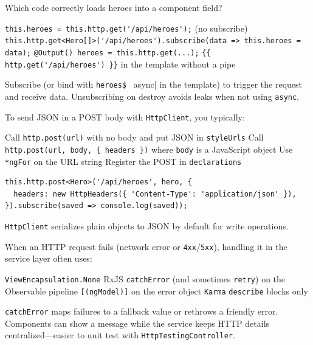 \question[4]
Which code correctly loads heroes into a component field?
\begin{choices}
  \choice \lstinline[style=tsinline]|this.heroes = this.http.get('/api/heroes');| (no subscribe)
  \CorrectChoice \lstinline[style=tsinline]|this.http.get<Hero[]>('/api/heroes').subscribe(data => this.heroes = data);|
  \choice \lstinline[style=tsinline]|@Output() heroes = this.http.get(...);|
  \choice \lstinline[style=htmlinline]|{{ http.get('/api/heroes') }}| in the template without a pipe
\end{choices}
\begin{solution}
  Subscribe (or bind with \lstinline[style=htmlinline]|heroes$ | async| in the template) to trigger the request and receive data. Unsubscribing on destroy avoids leaks when not using \lstinline[style=htmlinline]|async|.
\end{solution}

\question[4]
To send JSON in a POST body with \texttt{HttpClient}, you typically:
\begin{choices}
  \choice Call \lstinline[style=tsinline]|http.post(url)| with no body and put JSON in \texttt{styleUrls}
  \CorrectChoice Call \lstinline[style=tsinline]|http.post(url, body, { headers })| where \texttt{body} is a JavaScript object
  \choice Use \lstinline[style=htmlinline]|*ngFor| on the URL string
  \choice Register the POST in \texttt{declarations}
\end{choices}
\begin{solution}
\begin{lstlisting}[style=ts]
this.http.post<Hero>('/api/heroes', hero, {
  headers: new HttpHeaders({ 'Content-Type': 'application/json' }),
}).subscribe(saved => console.log(saved));
\end{lstlisting}
  \texttt{HttpClient} serializes plain objects to JSON by default for write operations.
\end{solution}

\question[4]
When an HTTP request fails (network error or \texttt{4xx}/\texttt{5xx}), handling it in the service layer often uses:
\begin{choices}
  \choice \lstinline[style=tsinline]|ViewEncapsulation.None|
  \CorrectChoice RxJS \lstinline[style=tsinline]|catchError| (and sometimes \lstinline[style=tsinline]|retry|) on the Observable pipeline
  \choice \lstinline[style=htmlinline]|[(ngModel)]| on the error object
  \choice \texttt{Karma} \lstinline[style=tsinline]|describe| blocks only
\end{choices}
\begin{solution}
  \lstinline[style=tsinline]|catchError| maps failures to a fallback value or rethrows a friendly error. Components can show a message while the service keeps HTTP details centralized---easier to unit test with \texttt{HttpTestingController}.
\end{solution}

